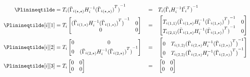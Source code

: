 \documentclass[../main.tex]{subfiles}
\begin{document}
\begin{align}
  \Plinineqtilde&=T_{i}{{(\linearcoefiineqnonzero)}^{-1}}&&=&&T_{i}{(\linearcoefi)}^{-1}\\
  \Plinineqtilde[i][1]&=T_{i} \left[
                        \begin{matrix}
                          {{(\linearcoefiineqnonzero[1,*])}^{-1}}&0\\
                          0&0
                        \end{matrix}
                             \right]&&=&& \left[
                                          \begin{matrix}
                                            \elem[1,1]{T_{i}}{{(\linearcoefiineqnonzero[1,*])}^{-1}}&0\\
                                            \elem[2,1]{T_{i}}{{(\linearcoefiineqnonzero[1,*])}^{-1}}&0\\
                                          \end{matrix}
  \right]\\
  \Plinineqtilde[i][2]&=T_{i} \left[
                        \begin{matrix}
                          0&0\\
                          0&{{(\linearcoefiineqnonzero[2,*])}^{-1}}\\
                        \end{matrix}
  \right]&&=&& \left[
               \begin{matrix}
                 0&\elem[1,2]{T_{i}}{{(\linearcoefiineqnonzero[2,*])}^{-1}}\\
                 0&\elem[2,2]{T_{i}}{{(\linearcoefiineqnonzero[2,*])}^{-1}}\\
               \end{matrix}
  \right]
  \\
  \Plinineqtilde[i][3]&=T_{i}
                        \left[
                        \begin{matrix}
                          0&0\\
                          0&0
                        \end{matrix}
                             \right]&&=&&\left[
                                          \begin{matrix}
                                            0&0\\
                                            0&0
                                          \end{matrix}
                                               \right]
\end{align}
\end{document}

